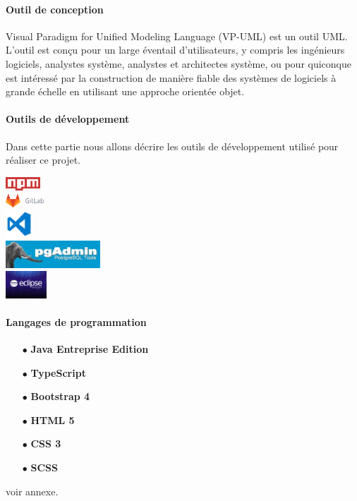 \documentclass{article}
\begin{document}
\paragraph{Outil de conception}
Visual Paradigm for Unified Modeling Language (VP-UML) est un outil UML. L'outil est conçu pour un large éventail d'utilisateurs, y compris les ingénieurs logiciels, analystes système, analystes et architectes système, ou pour quiconque est intéressé par la construction de manière fiable des systèmes de logiciels à grande échelle en utilisant une approche orientée objet.
\paragraph{Outils de développement}
Dans cette partie nous allons décrire les outils de développement utilisé pour réaliser ce projet.

\begin{center}
\includegraphics[height=0.2in]{npm.png}\\
\includegraphics[height=0.2in]{gitLab.png}\\
\includegraphics[height=0.4in]{VSCode.png}\\
\includegraphics[height=0.4in]{pgAdmin.jpg}\\
\vspace{0.5cm}
\includegraphics[height=0.4in]{eclipse.jpg}
\end{center}
\cleardoublepage

\paragraph{Langages de programmation}
\begin{enumerate}
\item [$\bullet$] \textbf{ Java Entreprise Edition}
\item[$\bullet$] \textbf{ TypeScript}
\item[$\bullet$] \textbf{ Bootstrap 4}
\item[$\bullet$] \textbf{ HTML 5}
\item [$\bullet$] \textbf{ CSS 3} 
\item[$\bullet$] \textbf{ SCSS}
\end{enumerate}
voir annexe.
\end{document}
